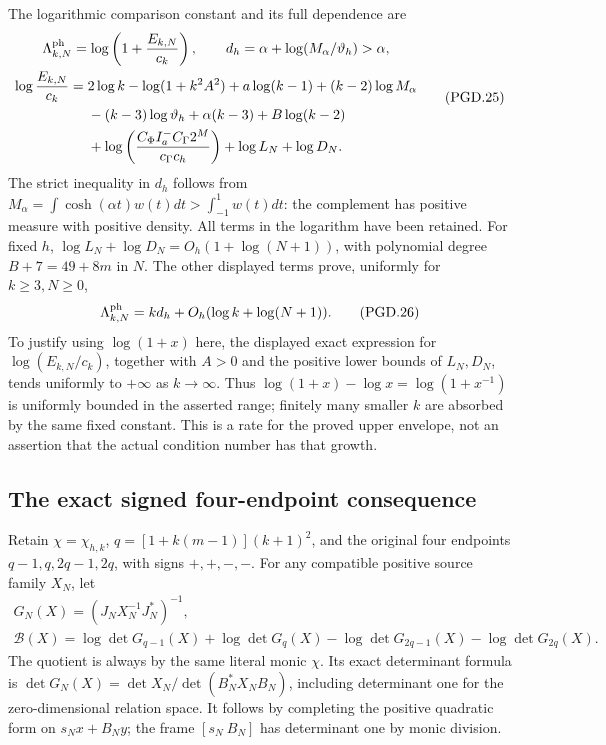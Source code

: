The logarithmic comparison constant and its full dependence are
\[
 \begin{gathered}
 \Lambda_{k,N}^{\rm ph}
     =\log\left(1+\frac{E_{k,N}}{c_k}\right),\qquad
 d_h=\alpha+\log(M_\alpha/\vartheta_h)>\alpha,\\
 \begin{aligned}
 \log\frac{E_{k,N}}{c_k}
 ={}&2\log k-\log(1+k^2A^2)+a\log(k-1)
       +(k-2)\log M_\alpha\\
    &-(k-3)\log\vartheta_h+\alpha(k-3)+B\log(k-2)\\
    &+\log\left(\frac{C_\Phi I_a^-C_\Gamma2^M}
                         {c_\Gamma c_h}\right)
       +\log L_N+\log D_N .
 \end{aligned}
 \end{gathered}
 \tag{PGD.25}\label{GraphV2:eq:pgd-log-cost}
\]
The strict inequality in \(d_h\) follows from
\(M_\alpha=\int\cosh(\alpha t)w(t)dt>\int_{-1}^1w(t)dt\):
the complement has positive measure with positive density. All terms
in the logarithm have been retained. For fixed \(h\),
\(\log L_N+\log D_N=O_h(1+\log(N+1))\), with polynomial
degree \(B+7=49+8m\) in \(N\). The other displayed terms prove,
uniformly for \(k\geq3,N\geq0\),
\[
 \Lambda_{k,N}^{\rm ph}
       =k d_h+O_h(\log k+\log(N+1)).
 \tag{PGD.26}\label{GraphV2:eq:pgd-cost-rate}
\]
To justify using \(\log(1+x)\) here, the displayed exact expression
for \(\log(E_{k,N}/c_k)\), together with \(A>0\) and the positive
lower bounds of \(L_N,D_N\), tends uniformly to \(+\infty\) as
\(k\to\infty\). Thus
\(\log(1+x)-\log x=\log(1+x^{-1})\) is uniformly bounded in
the asserted range; finitely many smaller \(k\) are absorbed by
the same fixed constant. This is a rate for the proved upper envelope,
not an assertion that the actual condition number has that growth.

\subsection{The exact signed four-endpoint consequence}

Retain \(\chi=\chi_{h,k}\),
\(q=[1+k(m-1)](k+1)^2\), and the original four endpoints
\(q-1,q,2q-1,2q\), with signs \(+,+,-,-\).
For any compatible positive source family \(X_N\), let
\[
 \begin{gathered}
 G_N(X)=(J_NX_N^{-1}J_N^*)^{-1},\\
 \mathcal B(X)=\log\det G_{q-1}(X)+\log\det G_q(X)
       -\log\det G_{2q-1}(X)-\log\det G_{2q}(X).
 \end{gathered}
 \tag{PGD.27}\label{GraphV2:eq:pgd-four-functional}
\]
The quotient is always by the same literal monic \(\chi\).
Its exact determinant formula is
\(\det G_N(X)=\det X_N/\det(B_N^*X_NB_N)\), including determinant
one for the zero-dimensional relation space. It follows by completing
the positive quadratic form on \(s_Nx+B_Ny\); the frame
\([s_N\ B_N]\) has determinant one by monic division.

